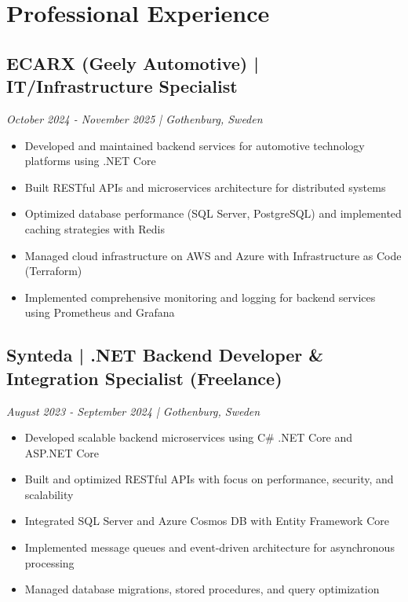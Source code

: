 \documentclass[11pt,a4paper]{article}
\begin{document}
\section*{Professional Experience}
\subsection*{ECARX (Geely Automotive) | IT/Infrastructure Specialist}
\textit{October 2024 - November 2025 | Gothenburg, Sweden}
\begin{itemize}[noitemsep]
\item Developed and maintained backend services for automotive technology platforms using .NET Core
\item Built RESTful APIs and microservices architecture for distributed systems
\item Optimized database performance (SQL Server, PostgreSQL) and implemented caching strategies with Redis
\item Managed cloud infrastructure on AWS and Azure with Infrastructure as Code (Terraform)
\item Implemented comprehensive monitoring and logging for backend services using Prometheus and Grafana
\end{itemize}

\subsection*{Synteda | .NET Backend Developer \& Integration Specialist (Freelance)}
\textit{August 2023 - September 2024 | Gothenburg, Sweden}
\begin{itemize}[noitemsep]
\item Developed scalable backend microservices using C\# .NET Core and ASP.NET Core
\item Built and optimized RESTful APIs with focus on performance, security, and scalability
\item Integrated SQL Server and Azure Cosmos DB with Entity Framework Core
\item Implemented message queues and event-driven architecture for asynchronous processing
\item Managed database migrations, stored procedures, and query optimization
\end{itemize}
\end{document}
